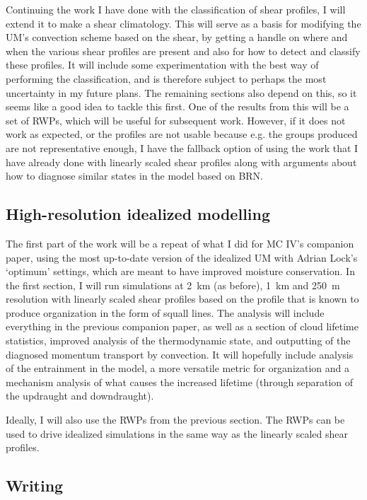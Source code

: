 \documentclass[11pt,a4paper]{article}
\begin{document}
Continuing the work I have done with the classification of shear profiles, I will extend it to make a shear climatology. This will serve as a basis for modifying the UM's convection scheme based on the shear, by getting a handle on where and  when the various shear profiles are present and also for how to detect and classify these profiles. It will include some experimentation with the best way of performing the classification, and is therefore subject to perhaps the most uncertainty in my future plans. The remaining sections also depend on this, so it seems like a good idea to tackle this first. One of the results from this will be a set of RWPs, which will be useful for subsequent work. However, if it does not work as expected, or the profiles are not usable because e.g. the groups produced are not representative enough, I have the fallback option of using the work that I have already done with linearly scaled shear profiles along with arguments about how to diagnose similar states in the model based on BRN.

\subsection{High-resolution idealized modelling}
\label{sec:High-resolution idealized modelling}

The first part of the work will be a repeat of what I did for MC IV's companion paper, using the most up-to-date version of the idealized UM with Adrian Lock's `optimum' settings, which are meant to have improved moisture conservation. In the first section, I will run simulations at \SI{2}{km} (as before), \SI{1}{km} and \SI{250}{m} resolution with linearly scaled shear profiles based on the profile that is known to produce organization in the form of squall lines. The analysis will include everything in the previous companion paper, as well as a section of cloud lifetime statistics, improved analysis of the thermodynamic state, and outputting of the diagnosed momentum transport by convection. It will hopefully include analysis of the entrainment in the model, a more versatile metric for organization and a mechanism analysis of what causes the increased lifetime (through separation of the updraught and downdraught).

Ideally, I will also use the RWPs from the previous section. The RWPs can be used to drive idealized simulations in the same way as the linearly scaled shear profiles.

\subsection{Writing}
\label{sec:Writing}
\end{document}
